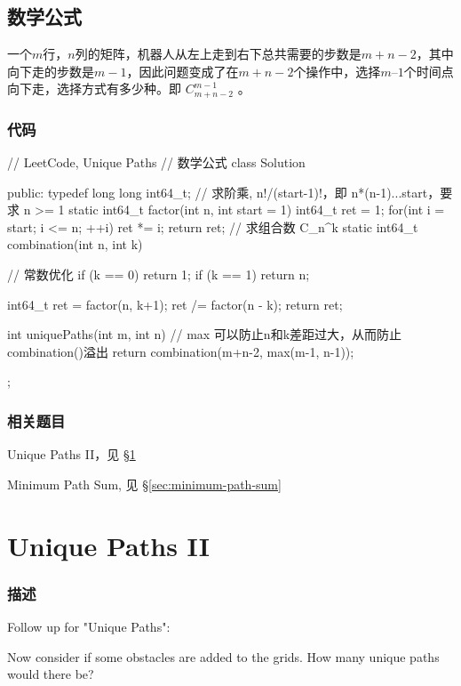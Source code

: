 \subsection{数学公式}
一个$m$行，$n$列的矩阵，机器人从左上走到右下总共需要的步数是$m+n-2$，其中向下走的步数是$m-1$，因此问题变成了在$m+n-2$个操作中，选择$m–1$个时间点向下走，选择方式有多少种。即 $C_{m+n-2}^{m-1}$ 。

\subsubsection{代码}
\begin{Code}
// LeetCode, Unique Paths
// 数学公式
class Solution {
public:
    typedef long long int64_t;
    // 求阶乘, n!/(start-1)!，即 n*(n-1)...start，要求 n >= 1
    static int64_t factor(int n, int start = 1) {
        int64_t  ret = 1;
        for(int i = start; i <= n; ++i)
            ret *= i;
        return ret;
    }
    // 求组合数 C_n^k
    static int64_t combination(int n, int k) {
        // 常数优化
        if (k == 0) return 1;
        if (k == 1) return n;

        int64_t ret = factor(n, k+1);
        ret /= factor(n - k);
        return ret;
    }

    int uniquePaths(int m, int n) {
        // max 可以防止n和k差距过大，从而防止combination()溢出
        return combination(m+n-2, max(m-1, n-1));
    }
};
\end{Code}


\subsubsection{相关题目}
\begindot
\item Unique Paths II，见 \S \ref{sec:unique-paths-ii}
\item Minimum Path Sum, 见 \S \ref{sec:minimum-path-sum}
\myenddot


\section{Unique Paths II} %
\label{sec:unique-paths-ii}


\subsubsection{描述}
Follow up for "Unique Paths":

Now consider if some obstacles are added to the grids. How many unique paths would there be?

